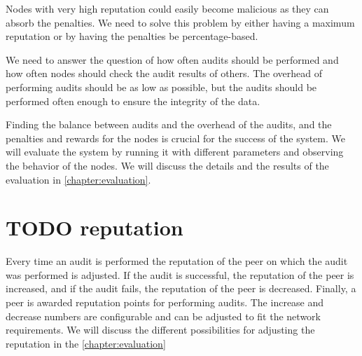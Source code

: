 Nodes with very high reputation could easily become malicious as they can absorb the penalties.
We need to solve this problem by either having a maximum reputation or by having the penalties be
percentage-based.

We need to answer the question of how often audits should be performed and how often nodes should
check the audit results of others.
The overhead of performing audits should be as low as possible, but the audits should be performed often enough
to ensure the integrity of the data.

Finding the balance between audits and the overhead of the audits, and the penalties and rewards for the nodes
is crucial for the success of the system.
We will evaluate the system by running it with different parameters and observing the behavior of the nodes.
We will discuss the details and the results of the evaluation in \ref{chapter:evaluation}.

\section{TODO reputation}
Every time an audit is performed the reputation of the peer on which the audit was performed is adjusted.
If the audit is successful, the reputation of the peer is increased,
and if the audit fails, the reputation of the peer is decreased.
Finally, a peer is awarded reputation points for performing audits.
The increase and decrease numbers are configurable and can be adjusted to fit the network requirements.
We will discuss the different possibilities for adjusting the reputation in the \autoref{chapter:evaluation}


